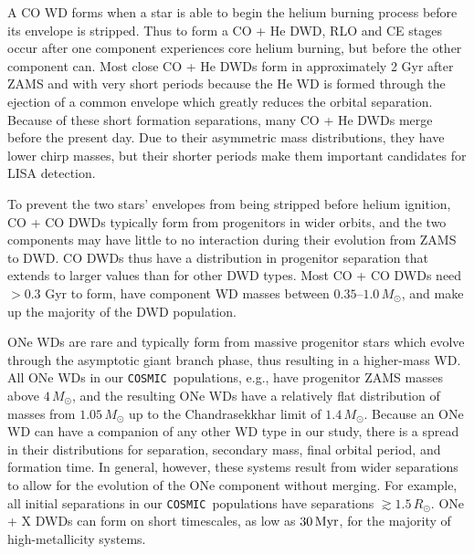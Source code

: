 \documentclass[twocolumn, linenumbers]{aastex631}
\newcommand{\cosmic}{\texttt{COSMIC}}
\begin{document}
A CO WD forms when a star is able to begin the helium burning process before its envelope is stripped. Thus to form a CO + He DWD, RLO and CE stages occur after one component experiences core helium burning, but before the other component can. Most close CO + He DWDs form in approximately 2 Gyr after ZAMS and with very short periods because the He WD is formed through the ejection of a common envelope which greatly reduces the orbital separation. Because of these short formation separations, many CO + He DWDs merge before the present day. Due to their asymmetric mass distributions, they have lower chirp masses, but their shorter periods make them important candidates for LISA detection. 

To prevent the two stars' envelopes from being stripped before helium ignition, CO + CO DWDs typically form from progenitors in wider orbits, and the two components may have little to no interaction during their evolution from ZAMS to DWD. CO DWDs thus have a distribution in progenitor separation that extends to larger values than for other DWD types. Most CO + CO DWDs need $> 0.3$ Gyr to form, have component WD masses between $0.35$--$1.0\,M_\odot$, and make up the majority of the DWD population. 


ONe WDs are rare and typically form from massive progenitor stars which evolve through the asymptotic giant branch phase, thus resulting in a higher-mass WD. All ONe WDs in our \cosmic\ populations, e.g., have progenitor ZAMS masses above $4\,M_\odot$, and the resulting ONe WDs have a relatively flat distribution of masses from $1.05\,M_\odot$ up to the Chandrasekkhar limit of $1.4\,M_\odot$. Because an ONe WD can have a companion of any other WD type in our study, there is a spread in their distributions for separation, secondary mass, final orbital period, and formation time. In general, however, these systems result from wider separations to allow for the evolution of the ONe component without merging. For example, all initial separations in our \cosmic \ populations have separations $\gtrsim 1.5\,R_\odot$. ONe + X DWDs can form on short timescales, as low as $30\,\rm{Myr}$, for the majority of high-metallicity systems. 
\end{document}
